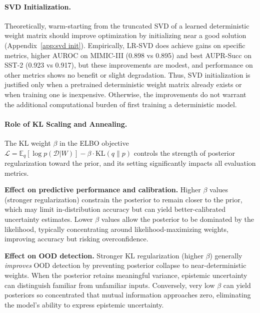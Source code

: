 \documentclass{article}
\theoremstyle{plain}
\theoremstyle{definition}
\theoremstyle{remark}
\begin{document}
\paragraph{SVD Initialization.}
Theoretically, warm-starting from the truncated SVD of a learned deterministic weight matrix should improve optimization by initializing near a good solution (Appendix~\ref{app:svd init}). Empirically, LR-SVD does achieve gains on specific metrics, higher AUROC on MIMIC-III (0.898 vs 0.895) and best AUPR-Succ on SST-2 (0.923 vs 0.917), but these improvements are modest, and performance on other metrics shows no benefit or slight degradation. Thus, SVD initialization is justified only when a pretrained deterministic weight matrix already exists or when training one is inexpensive. Otherwise, the improvements do not warrant the additional computational burden of first training a deterministic model.



\paragraph{Role of KL Scaling and Annealing.}
The KL weight $\beta$ in the ELBO objective $\mathcal{L} = \mathbb{E}_{q}[\log p(\mathcal{D}|W)] - \beta \cdot \mathrm{KL}(q \| p)$ controls the strength of posterior regularization toward the prior, and its setting significantly impacts all evaluation metrics.

\textbf{Effect on predictive performance and calibration.} Higher $\beta$ values (stronger regularization) constrain the posterior to remain closer to the prior, which may limit in-distribution accuracy but can yield better-calibrated uncertainty estimates. Lower $\beta$ values allow the posterior to be dominated by the likelihood, typically concentrating around likelihood-maximizing weights, improving accuracy but risking overconfidence.

\textbf{Effect on OOD detection.} Stronger KL regularization (higher $\beta$) generally \emph{improves} OOD detection by preventing posterior collapse to near-deterministic weights. When the posterior retains meaningful variance, epistemic uncertainty can distinguish familiar from unfamiliar inputs. Conversely, very low $\beta$ can yield posteriors so concentrated that mutual information approaches zero, eliminating the model's ability to express epistemic uncertainty.
\end{document}
